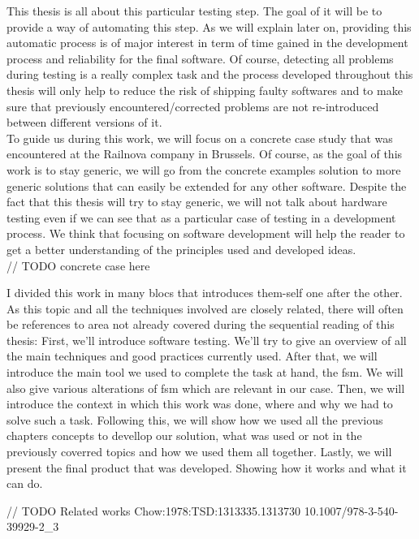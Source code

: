\documentclass[12pt]{article}
\theoremstyle{definition}
\theoremstyle{definition}
\theoremstyle{remark}
\begin{document}
This thesis is all about this particular testing step. The goal of it will be to provide a way of automating this step. As we will explain later on, providing this automatic process is of major interest in term of time gained in the development process and reliability for the final software. Of course, detecting all problems during testing is a really complex task and the process developed throughout this thesis will only help to reduce the risk of shipping faulty softwares and to make sure that previously encountered/corrected problems are not re-introduced between different versions of it.\\

To guide us during this work, we will focus on a concrete case study that was encountered at the Railnova company in Brussels. Of course, as the goal of this work is to stay generic, we will go from the concrete examples solution to more generic solutions that can easily be extended for any other software. Despite the fact that this thesis will try to stay generic, we will not talk about hardware testing even if we can see that as a particular case of testing in a development process. We think that focusing on software development will help the reader to get a better understanding of the principles used and developed ideas.\\

// TODO concrete case here

I divided this work in many blocs that introduces them-self one after the other. As this topic and all the techniques involved are closely related, there will often be references to area not already covered during the sequential reading of this thesis: First, we'll introduce software testing. We'll try to give an overview of all the main techniques and good practices currently used. After that, we will introduce the main tool we used to complete the task at hand, the \gls{fsm}. We will also give various alterations of \gls{fsm} which are relevant in our case. Then, we will introduce the context in which this work was done, where and why we had to solve such a task. Following this, we will show how we used all the previous chapters concepts to devellop our solution, what was used or not in the previously coverred topics and how we used them all together. Lastly, we will present the final product that was developed. Showing how it works and what it can do.

// TODO Related works
Chow:1978:TSD:1313335.1313730
10.1007/978-3-540-39929-2_3

\end{document}
